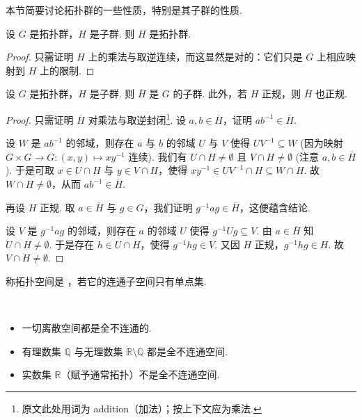 本节简要讨论拓扑群的一些性质，特别是其子群的性质.

\begin{proposition}\label{c1-prop-4-1}
设 $G$ 是拓扑群，$H$ 是子群. 则 $H$ 是拓扑群.
\end{proposition}

\begin{proof}
只需证明 $H$ 上的乘法与取逆连续，而这显然是对的：它们只是 $G$ 上相应映射到 $H$ 上的限制.
\end{proof}

\begin{proposition}\label{c1-prop-4-2}
设 $G$ 是拓扑群，$H$ 是子群. 则 $\overline{H}$ 是 $G$ 的子群. 此外，若 $H$ 正规，则 $\overline{H}$ 也正规.
\end{proposition}

\begin{proof}
只需证明 $\overline{H}$ 对乘法与取逆封闭\footnote{原文此处用词为 addition（加法）；按上下文应为乘法.}. 设 $a,b\in\overline{H}$，证明 $ab^{-1}\in\overline{H}$.

设 $W$ 是 $ab^{-1}$ 的邻域，则存在 $a$ 与 $b$ 的邻域 $U$ 与 $V$ 使得 $UV^{-1}\subseteq W$ (因为映射 $G\times G\to G:(x,y)\mapsto xy^{-1}$ 连续). 我们有 $U\cap H\neq\emptyset$ 且 $V\cap H\neq\emptyset$ (注意 $a,b\in\overline{H}$). 于是可取 $x\in U\cap H$ 与 $y\in V\cap H$，使得 $xy^{-1}\in UV^{-1}\cap H\subseteq W\cap H$. 故 $W\cap H\neq\emptyset$，从而 $ab^{-1}\in\overline{H}$.

再设 $H$ 正规. 取 $a\in\overline{H}$ 与 $g\in G$，我们证明 $g^{-1}ag\in\overline{H}$，这便蕴含结论.

设 $V$ 是 $g^{-1}ag$ 的邻域，则存在 $a$ 的邻域 $U$ 使得 $g^{-1}Ug\subseteq V$. 由 $a\in\overline{H}$ 知 $U\cap H\neq\emptyset$. 于是存在 $h\in U\cap H$，使得 $g^{-1}hg\in V$. 又因 $H$ 正规，$g^{-1}hg\in H$. 故 $V\cap H\neq\emptyset$.
\end{proof}

\begin{definition}\label{c1-def-4-1}
称拓扑空间是 ，若它的连通子空间只有单点集.
\end{definition}

\begin{examples}\label{c1-ex-4-2}
\
\begin{itemize}
    \item 一切离散空间都是全不连通的.
    \item 有理数集 $\mathbb{Q}$ 与无理数集 $\mathbb{R}\setminus\mathbb{Q}$ 都是全不连通空间.
    \item 实数集 $\mathbb{R}$（赋予通常拓扑）不是全不连通空间.
\end{itemize}
\end{examples}

